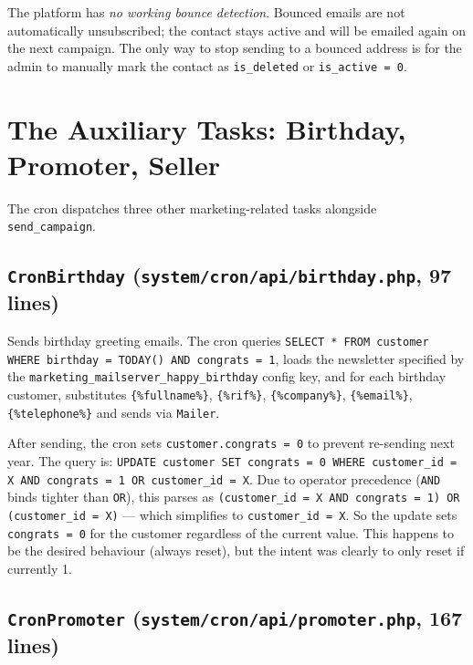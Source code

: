 \documentclass[11pt,a4paper]{article}
\begin{document}
The platform has \emph{no working bounce detection}. Bounced
emails are not automatically unsubscribed; the contact stays
active and will be emailed again on the next campaign. The only
way to stop sending to a bounced address is for the admin to
manually mark the contact as \texttt{is\_deleted} or
\texttt{is\_active = 0}.

\section{The Auxiliary Tasks: Birthday, Promoter, Seller}\label{sec:aux-tasks}

The cron dispatches three other marketing-related tasks alongside
\texttt{send\_campaign}.

\subsection{\texttt{CronBirthday} (\texttt{system/cron/api/birthday.php}, 97 lines)}

Sends birthday greeting emails. The cron queries
\texttt{SELECT * FROM customer WHERE birthday = TODAY() AND
congrats = 1}, loads the newsletter specified by the
\texttt{marketing\_mailserver\_happy\_birthday} config key, and
for each birthday customer, substitutes
\texttt{\{\%fullname\%\}}, \texttt{\{\%rif\%\}},
\texttt{\{\%company\%\}}, \texttt{\{\%email\%\}},
\texttt{\{\%telephone\%\}} and sends via \texttt{Mailer}.

\begin{findingbox}
After sending, the cron sets \texttt{customer.congrats = 0} to
prevent re-sending next year. The query is:
\texttt{UPDATE customer SET congrats = 0 WHERE customer\_id = X
AND congrats = 1 OR customer\_id = X}. Due to operator
precedence (\texttt{AND} binds tighter than \texttt{OR}), this
parses as \texttt{(customer\_id = X AND congrats = 1) OR
(customer\_id = X)} --- which simplifies to
\texttt{customer\_id = X}. So the update sets
\texttt{congrats = 0} for the customer regardless of the current
value. This happens to be the desired behaviour (always reset),
but the intent was clearly to only reset if currently 1.
\end{findingbox}

\subsection{\texttt{CronPromoter} (\texttt{system/cron/api/promoter.php}, 167 lines)}
\end{document}
